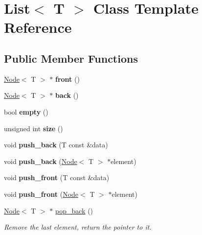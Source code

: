 \hypertarget{classList}{}\section{List$<$ T $>$ Class Template Reference}
\label{classList}
\subsection*{Public Member Functions}
\begin{DoxyCompactItemize}
\item 
\mbox{\label{classList_a0ea52d2f31cba662a5121ba724a1afc6}} 
\hyperlink{structNode}{Node}$<$ T $>$ $\ast$ {\bfseries front} ()
\item 
\mbox{\label{classList_a0e0849a1ca10791cb2788ec41af14c26}} 
\hyperlink{structNode}{Node}$<$ T $>$ $\ast$ {\bfseries back} ()
\item 
\mbox{\label{classList_a3737ca60365287ce663393d8c07d1a41}} 
bool {\bfseries empty} ()
\item 
\mbox{\label{classList_ad908ab5cf19370fcdf61cf1927e5e8f5}} 
unsigned int {\bfseries size} ()
\item 
\mbox{\label{classList_afc370c46b52217d24992076d66e78c2e}} 
void {\bfseries push\+\_\+back} (T const \&data)
\item 
\mbox{\label{classList_a36d7022ab9a7fadeb45a5933e64e8bd8}} 
void {\bfseries push\+\_\+back} (\hyperlink{structNode}{Node}$<$ T $>$ $\ast$element)
\item 
\mbox{\label{classList_ab3a121baf35c7fa3f83717ede3a46e1b}} 
void {\bfseries push\+\_\+front} (T const \&data)
\item 
\mbox{\label{classList_aeb009afd4f0f626603455d5ee9e3dfc3}} 
void {\bfseries push\+\_\+front} (\hyperlink{structNode}{Node}$<$ T $>$ $\ast$element)
\item 
\hyperlink{structNode}{Node}$<$ T $>$ $\ast$ \hyperlink{classList_aca64c15e326dd7515499310bc9f2efb0}{pop\+\_\+back} ()
\begin{DoxyCompactList}\small\item\em Remove the last element, return the pointer to it. \end{DoxyCompactList}\item 

\end{DoxyCompactItemize}
